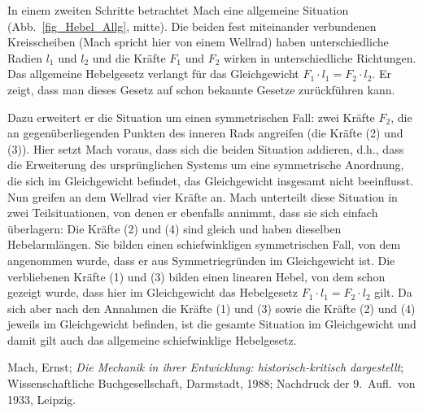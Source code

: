 In einem zweiten Schritte betrachtet Mach eine allgemeine Situation (Abb.\ \ref{fig_Hebel_Allg}, mitte). 
Die beiden fest miteinander verbundenen Kreisscheiben (Mach spricht hier von einem Wellrad) haben
unterschiedliche Radien $l_1$ und $l_2$ und die Kr\"afte $F_1$ und $F_2$ wirken in unterschiedliche
Richtungen. Das allgemeine Hebelgesetz verlangt f\"ur das Gleichgewicht $F_1\cdot l_1=F_2\cdot l_2$.  
Er zeigt, dass man dieses Gesetz auf schon bekannte Gesetze zur\"uckf\"uhren kann.

Dazu erweitert er die Situation um einen symmetrischen Fall: zwei Kr\"afte $F_2$, die an gegen\"uberliegenden
Punkten des inneren Rads angreifen (die Kr\"afte (2) und (3)). Hier setzt Mach voraus, dass sich die
beiden Situation addieren, d.h., dass die Erweiterung des urspr\"unglichen Systems um eine
symmetrische Anordnung, die sich im Gleichgewicht befindet, das Gleichgewicht insgesamt nicht
beeinflusst. Nun greifen an dem Wellrad vier Kr\"afte an. Mach unterteilt diese Situation in zwei
Teilsituationen, von denen er ebenfalls annimmt, dass sie sich einfach \"uberlagern: Die Kr\"afte
(2) und (4) sind gleich und haben dieselben Hebelarml\"angen. Sie bilden einen schiefwinkligen
symmetrischen Fall, von dem angenommen wurde, dass er aus Symmetriegr\"unden im Gleichgewicht
ist. Die verbliebenen Kr\"afte (1) und (3) bilden einen linearen Hebel, von dem schon gezeigt wurde,
dass hier im Gleichgewicht das Hebelgesetz $F_1\cdot l_1=F_2\cdot l_2$ gilt. Da sich aber nach den
Annahmen die Kr\"afte (1) und (3) sowie die Kr\"afte (2) und (4) jeweils im Gleichgewicht befinden,
ist die gesamte Situation im Gleichgewicht und damit gilt auch das allgemeine schiefwinklige
Hebelgesetz.

  
\begin{thebibliography}{9}
 Mach, Ernst; \textit{Die Mechanik in ihrer Entwicklung: historisch-kritisch dargestellt};
                Wissenschaftliche Buchgesellschaft, Darmstadt, 1988; Nachdruck der 9.\ Aufl.\ von 1933,
                Leipzig.
\end{thebibliography}

%

